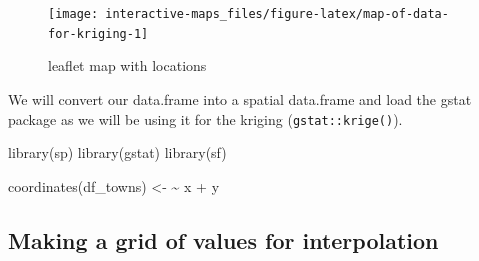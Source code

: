 \documentclass[
]{book}
\newenvironment{Shaded}{\begin{snugshade}}{\end{snugshade}}
\newcommand{\AttributeTok}[1]{\textcolor[rgb]{0.77,0.63,0.00}{#1}}
\newcommand{\CommentTok}[1]{\textcolor[rgb]{0.56,0.35,0.01}{\textit{#1}}}
\newcommand{\DecValTok}[1]{\textcolor[rgb]{0.00,0.00,0.81}{#1}}
\newcommand{\ErrorTok}[1]{\textcolor[rgb]{0.64,0.00,0.00}{\textbf{#1}}}
\newcommand{\FunctionTok}[1]{\textcolor[rgb]{0.00,0.00,0.00}{#1}}
\newcommand{\NormalTok}[1]{#1}
\newcommand{\OtherTok}[1]{\textcolor[rgb]{0.56,0.35,0.01}{#1}}
\newcommand{\SpecialCharTok}[1]{\textcolor[rgb]{0.00,0.00,0.00}{#1}}
\newcommand{\StringTok}[1]{\textcolor[rgb]{0.31,0.60,0.02}{#1}}
\begin{document}
\begin{Shaded}
\end{Shaded}

\begin{figure}
\texttt{[image: interactive-maps\_files/figure-latex/map-of-data-for-kriging-1]} \caption{leaflet map with locations}\label{fig:map-of-data-for-kriging}
\end{figure}

We will convert our data.frame into a spatial data.frame and load the gstat package as we will be using it for the kriging (\texttt{gstat::krige()}).

\begin{Shaded}
\begin{Highlighting}[]
\FunctionTok{library}\NormalTok{(sp)}
\FunctionTok{library}\NormalTok{(gstat)}
\FunctionTok{library}\NormalTok{(sf)}

\FunctionTok{coordinates}\NormalTok{(df\_towns) }\OtherTok{\textless{}{-}} \ErrorTok{\textasciitilde{}}\NormalTok{ x }\SpecialCharTok{+}\NormalTok{ y}
\end{Highlighting}
\end{Shaded}

\hypertarget{making-a-grid-of-values-for-interpolation}{%
\subsection{Making a grid of values for interpolation}\label{making-a-grid-of-values-for-interpolation}}
\end{document}
